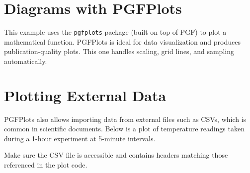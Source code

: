 \begin{center}
\end{center}

\section{Diagrams with PGFPlots}

This example uses the \texttt{pgfplots} package (built on top of PGF) to plot a mathematical function. PGFPlots is ideal for data visualization and produces publication-quality plots. This one handles scaling, grid lines, and sampling automatically.

\begin{center}
\end{center}

\clearpage
\section{Plotting External Data}

PGFPlots also allows importing data from external files such as CSVs, which is common in scientific documents. Below is a plot of temperature readings taken during a 1-hour experiment at 5-minute intervals.

Make sure the CSV file is accessible and contains headers matching those referenced in the plot code.


